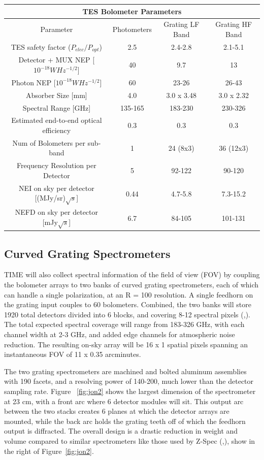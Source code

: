 \documentclass[manuscript]{aastex}
\begin{document}
\begin{center}
    \begin{tabular}{|c|c|c|c|}
    \hline
    \multicolumn{4}{c}{TES Bolometer Parameters} \\
    \hline
    \hline
    Parameter & Photometers & Grating LF Band & Grating HF Band \\
    \hline
    TES safety factor ($P_{elec}/P_{opt}$) & 2.5 & 2.4-2.8 & 2.1-5.1 \\
    Detector + MUX NEP [$10^{-18} W Hz^{-1/2}$] & 40 & 9.7 & 13 \\
    Photon NEP [$10^{-18} W Hz^{-1/2}$] & 60 & 23-26 & 26-43 \\
    Absorber Size [mm] & 4.0 & 3.0 x 3.48 & 3.0 x 2.32 \\
    Spectral Range [GHz] & 135-165 & 183-230 & 230-326 \\
    Estimated end-to-end optical efficiency & 0.3 & 0.3 & 0.3 \\
    Num of Bolometers per sub-band & 1 & 24 (8x3) & 36 (12x3) \\
    Frequency Resolution per Detector & 5 & 92-122 & 90-120 \\
    NEI on sky per detector [(MJy/sr)$\sqrt{s}$] & 0.44 & 4.7-5.8 & 7.3-15.2 \\
    NEFD on sky per detector [mJy$\sqrt{s}$] & 6.7 & 84-105 & 101-131 \\
    \hline
    \end{tabular}
\end{center}

\subsection{\textbf{Curved Grating Spectrometers}}
TIME will also collect spectral information of the field of view (FOV) by coupling the bolometer arrays to two banks of curved grating spectrometers, each of which can handle a single polarization, at an R = 100 resolution. A single feedhorn on the grating input couples to 60 bolometers. Combined, the two banks will store 1920 total detectors divided into 6 blocks, and covering 8-12 spectral pixels  (\cite{Crites2014},\cite{Hunacek2016}). The total expected spectral coverage will range from 183-326 GHz, with each channel width at 2-3 GHz, and added edge channels for atmospheric noise reduction. The resulting on-sky array will be 16 x 1 spatial pixels spanning an instantaneous FOV of 11 x 0.35 arcminutes.

The two grating spectrometers are machined and bolted aluminum assemblies with 190 facets, and a resolving power of 140-200, much lower than the detector sampling rate. Figure ~\ref{fig:jon2} shows the largest dimension of the spectrometer at 23 cm, with a front arc where 6 detector modules will sit. This output arc between the two stacks creates 6 planes at which the detector arrays are mounted, while the back arc holds the grating teeth off of which the feedhorn output is diffracted. The overall design is a drastic reduction in weight and volume compared to similar spectrometers like those used by Z-Spec (\cite{Bradford2004},\cite{Naylor2003}), show in the right of Figure~\ref{fig:jon2}.
\end{document}
